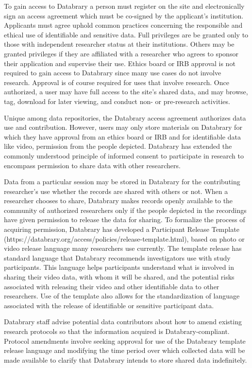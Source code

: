 \documentclass[letterpaper,man,apacite]{apa6}
\begin{document}
To gain access to Databrary a person must register on the site and electronically sign an access agreement which must be co-signed by the applicant's institution. 
Applicants must agree uphold common practices concerning the responsible and ethical use of identifiable and sensitive data. 
Full privileges are be granted only to those with independent researcher status at their institutions. 
Others may be granted privileges if they are affiliated with a researcher who agrees to sponsor their application and supervise their use.
Ethics board or IRB approval is not required to gain access to Databrary since many use cases do not involve research.
Approval is of course required for uses that involve research.
Once authorized, a user may have full access to the site's shared data, and may browse, tag, download for later viewing, and conduct non- or pre-research activities. 

Unique among data repositories, the Databrary access agreement authorizes data use and contribution.
However, users may only store materials on Databrary for which they have approval from an ethics board or IRB and for identifiable data like video, permission from the people depicted. 
Databrary has extended the commonly understood principle of informed consent to participate in research to encompass permission to share data with other researchers.

Data from a particular session may be stored in Databrary for the contributing researcher’s use whether the records are shared with others or not. 
When a researcher chooses to share, Databrary makes records openly available to the community of authorized researchers only if the people depicted in the recordings have given permission to release the data for sharing. 
To formalize the process of acquiring permission, Databrary has developed a Participant Release Template (https://databrary.org/access/policies/release-template.html), based on photo or video release language many researchers use currently. 
The template release has standard language that Databrary recommends investigators use with study participants. 
This language helps participants understand what is involved in sharing their video data, with whom it will be shared, and the potential risks associated with releasing their video and other identifiable data to other researchers. 
Use of the template also allows for the standardization of language associated with the release of identifiable or sensitive participant data.
 
Databrary staff advise potential data contributors about how to amend existing research protocols so that the information acquired is Databrary-compliant.
Protocol amendments involve seeking approval for use of the Databrary template release language and modifying the time period over which collected data will be made available to clarify that Databrary intends to store shared data indefinitely.
\end{document}
